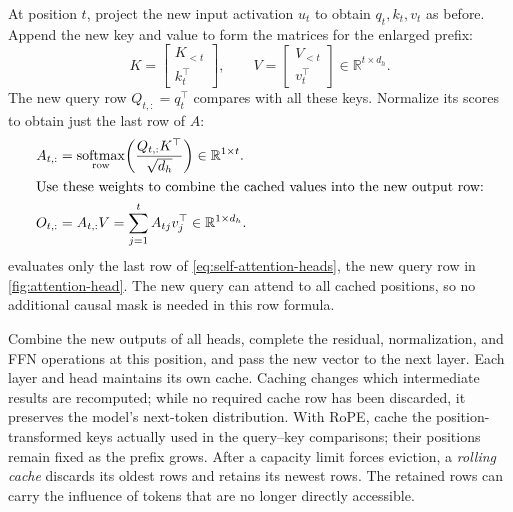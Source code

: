 \documentclass[11pt,twoside]{article}
\DeclareMathOperator{\softmax}{softmax}
\newcommand{\R}{\mathbb R}
\theoremstyle{plain}
\theoremstyle{definition}
\theoremstyle{remark}
\begin{document}
At position $t$, project the new input activation $u_t$ to obtain
$q_t,k_t,v_t$ as before. Append the new key and value to form the matrices
for the enlarged prefix:
\begin{equation}
K=
\begin{bmatrix}K_{<t}\\k_t^\top\end{bmatrix},
\qquad
V=
\begin{bmatrix}V_{<t}\\v_t^\top\end{bmatrix}
\in\R^{t\times d_h}.
\label{eq:kv-cache-update}
\end{equation}
The new query row $Q_{t,:}=q_t^\top$ compares with all these keys.
Normalize its scores to obtain just the last row of $A$:
\begin{align}
A_{t,:}
&=\softmax_{\mathrm{row}}\!\left(
\frac{Q_{t,:}K^\top}{\sqrt{d_h}}\right)\in\R^{1\times t}.
\nonumber\\
\intertext{Use these weights to combine the cached values into the new
output row:}
O_{t,:}&=A_{t,:}V
=\sum_{j=1}^t A_{tj}v_j^\top\in\R^{1\times d_h}.
\label{eq:cached-head}
\end{align}
 evaluates only the last row of
\eqref{eq:self-attention-heads},
the new query row in \cref{fig:attention-head}.
The new query can attend to all cached positions, so no additional causal mask
is needed in this row formula.

Combine the new outputs of all heads, complete the residual, normalization,
and FFN operations at this position, and pass the new vector to the next layer.
Each layer and
head maintains its own cache. Caching changes which intermediate results
are recomputed; while no required cache row has been discarded, it preserves
the model's next-token distribution.
With RoPE, cache the position-transformed keys actually used in the
query--key comparisons; their positions remain fixed as the prefix grows.
After a capacity limit forces eviction, a \emph{rolling cache} discards its
oldest rows and retains its newest rows. The retained rows can carry the
influence of tokens that are no longer directly accessible.
\label{en:rolling-kv}
\end{document}
